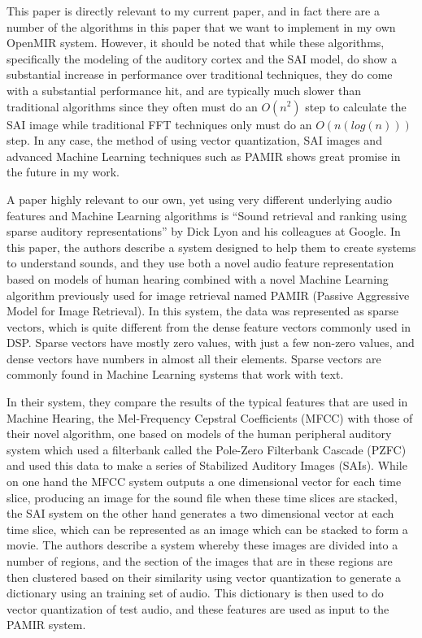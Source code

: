 \documentclass[12pt,oneside]{book}
\begin{document}
This paper is directly relevant to my current paper, and in fact there
are a number of the algorithms in this paper that we want to implement
in my own OpenMIR system.  However, it should be noted that while
these algorithms, specifically the modeling of the auditory cortex and
the SAI model, do show a substantial increase in performance over
traditional techniques, they do come with a substantial performance
hit, and are typically much slower than traditional algorithms since
they often must do an $O(n^2)$ step to calculate the SAI image while
traditional FFT techniques only must do an $O(n(log(n)))$ step.  In
any case, the method of using vector quantization, SAI images and
advanced Machine Learning techniques such as PAMIR shows great promise
in the future in my work.

A paper highly relevant to our own, yet using very different
underlying audio features and Machine Learning algorithms is ``Sound
retrieval and ranking using sparse auditory representations''
\cite{lyon10} by Dick Lyon and his colleagues at Google.  In this
paper, the authors describe a system designed to help them to create
systems to understand sounds, and they use both a novel audio feature
representation based on models of human hearing combined with a novel
Machine Learning algorithm previously used for image retrieval named
PAMIR (Passive Aggressive Model for Image Retrieval).  In this system,
the data was represented as sparse vectors, which is quite different
from the dense feature vectors commonly used in DSP.  Sparse vectors
have mostly zero values, with just a few non-zero values, and dense
vectors have numbers in almost all their elements.  Sparse vectors are
commonly found in Machine Learning systems that work with text.

In their system, they compare the results of the typical features that
are used in Machine Hearing, the Mel-Frequency Cepstral Coefficients
\cite{Logan00melfrequency} (MFCC) with those of their novel algorithm,
one based on models of the human peripheral auditory system which used
a filterbank called the Pole-Zero Filterbank Cascade (PZFC) and used
this data to make a series of Stabilized Auditory Images (SAIs).
While on one hand the MFCC system outputs a one dimensional vector for
each time slice, producing an image for the sound file when these time
slices are stacked, the SAI system on the other hand generates a two
dimensional vector at each time slice, which can be represented as an
image which can be stacked to form a movie.  The authors describe a
system whereby these images are divided into a number of regions, and
the section of the images that are in these regions are then clustered
based on their similarity using vector quantization to generate a
dictionary using an training set of audio.  This dictionary is then
used to do vector quantization of test audio, and these features are
used as input to the PAMIR system.
\end{document}
